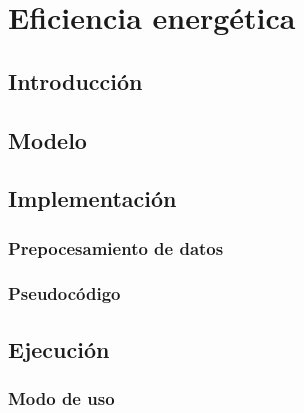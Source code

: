 \newpage
\section{Eficiencia energética}


\subsection{Introducción}


\subsection{Modelo}


\subsection{Implementación}

\subsubsection{Prepocesamiento de datos}

\subsubsection{Pseudocódigo}


\subsection{Ejecución}

\subsubsection{Modo de uso}

